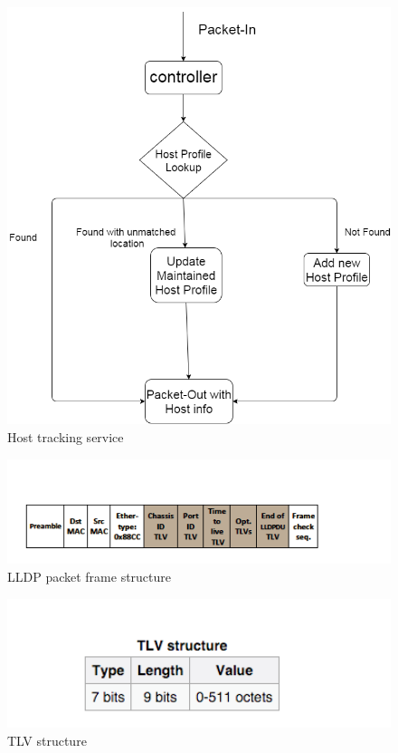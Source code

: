 \begin{figure}[H]
\begin{center} 
\includegraphics[width=1\textwidth]{figures/Host_tracking.png}
\end{center}
\caption{Host tracking service}
\label{HTS}
\end{figure}

\begin{figure}[H]
\begin{center} 
\includegraphics[width=1\textwidth]{figures/LLDP_packet_format.png}
\end{center}
\caption{LLDP packet frame structure\cite{LLDP_WS}}
\label{LLDP_frame}
\end{figure}

\begin{figure}[H]
\begin{center} 
\includegraphics[width=1\textwidth]{figures/TLV_structure.png}
\end{center}
\caption{TLV structure \cite{LLDP_WS}}
\label{TLV}
\end{figure}

